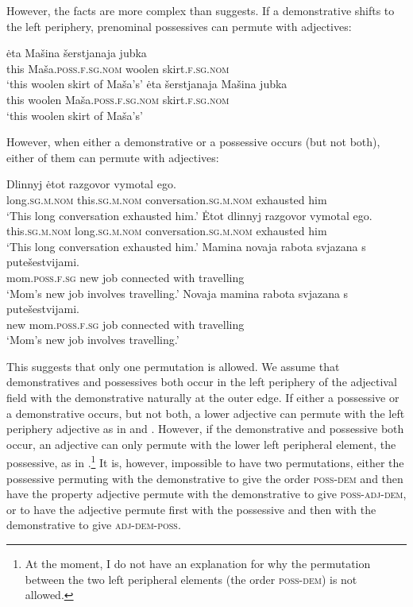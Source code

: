 \documentclass[output=paper,
colorlinks,
citecolor=brown,
newtxmath
]{langscibook}
\begin{document}
\noindent However, the facts are more complex than \citeauthor{Pereltsvaig2007} suggests. If a demonstrative shifts to the left periphery, prenominal possessives can permute with adjectives:


\ea
    \ea \gll ėta Mašina šerstjanaja jubka\label{masinajubka1}\\
    this Maša.\textsc{poss.f.sg.nom} woolen skirt.\textsc{f.sg.nom}\\
    \glt `this woolen skirt of Maša's'
    \ex\label{masinajubka2} \gll ėta šerstjanaja Mašina jubka\\
    this woolen Maša.\textsc{poss.f.sg.nom} skirt.\textsc{f.sg.nom}\\
    \glt `this woolen skirt of Maša's'
\z\z

\noindent However, when either a demonstrative or a possessive occurs (but not both), either of them can permute with adjectives:


\ea\label{razgovor}
    \ea \gll Dlinnyj ėtot razgovor vymotal ego.\\
    long.\textsc{sg.m.nom} this.\textsc{sg.m.nom} conversation.\textsc{sg.m.nom} exhausted him\\
    \glt `This long conversation exhausted him.'
    \ex \gll Ėtot dlinnyj razgovor vymotal ego.\\
    this.\textsc{sg.m.nom} long.\textsc{sg.m.nom} conversation.\textsc{sg.m.nom} exhausted him\\
    \glt `This long conversation exhausted him.'
\z\ex\label{rabota}
    \ea \gll Mamina novaja rabota svjazana s putešestvijami.\\
    mom.\textsc{poss.f.sg} new job connected with travelling\\
    \glt `Mom's new job involves travelling.'
    \ex \gll Novaja mamina rabota svjazana s putešestvijami.\\
    new mom.\textsc{poss.f.sg} job connected with travelling\\
    \glt `Mom's new job involves travelling.'
\z\z

\noindent This suggests that only one permutation is allowed. We assume that demonstratives and possessives both occur in the left periphery of the adjectival field with the demonstrative naturally at the outer edge. If either a possessive or a demonstrative occurs, but not both, a lower adjective can permute with the left periphery adjective as in  and . However, if the demonstrative and possessive both occur, an adjective can only permute with the lower left peripheral element, the possessive, as in .\footnote{At the moment, I do not have an explanation for why the permutation between the two left peripheral elements (the order \textsc{poss-dem}) is not allowed.} It is, however, impossible to have two permutations, either the possessive permuting with the demonstrative to give the order \textsc{poss-dem} and then have the property adjective permute with the demonstrative to give \textsc{poss-adj-dem}, or to have the adjective permute first with the possessive and then with the demonstrative to give \textsc{adj-dem-poss}.
\end{document}
